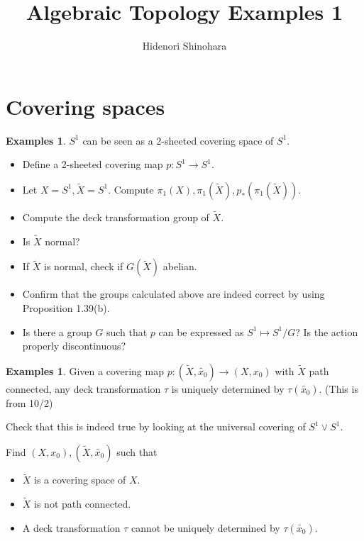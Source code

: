 \documentclass[12pt, psamsfonts]{amsart}
\theoremstyle{definition}
\newtheorem{exmps}[thm]{Examples}
\theoremstyle{remark}
\numberwithin{equation}{section}
\begin{document}
\title{Algebraic Topology Examples 1}
\author{Hidenori Shinohara}
\maketitle

\section{Covering spaces}

\begin{exmps}
  $S^1$ can be seen as a 2-sheeted covering space of $S^1$.
  \begin{itemize}
    \item
      Define a 2-sheeted covering map $p: S^1 \rightarrow S^1$.
    \item
      Let $X = S^1, \tilde{X} = S^1$.
      Compute $\pi_1(X), \pi_1(\tilde{X}), p_*(\pi_1(\tilde{X}))$.
    \item
      Compute the deck transformation group of $\tilde{X}$.
    \item
      Is $\tilde{X}$ normal?
    \item
      If $\tilde{X}$ is normal, check if $G(\tilde{X})$ abelian.
    \item
      Confirm that the groups calculated above are indeed correct by using Proposition 1.39(b). 
    \item
      Is there a group $G$ such that $p$ can be expressed as $S^1 \mapsto S^1 / G$?
      Is the action properly discontinuous?
  \end{itemize}
\end{exmps}

\begin{exmps}
  Given a covering map $p: (\tilde{X}, \tilde{x_0}) \rightarrow (X, x_0)$ with $\tilde{X}$ path connected, any deck transformation $\tau$ is uniquely determined by $\tau(\tilde{x_0})$.
  (This is from 10/2)

  Check that this is indeed true by looking at the universal covering of $S^1 \vee S^1$.

  Find $(X, x_0), (\tilde{X}, \tilde{x_0})$ such that
  \begin{itemize}
    \item
      $\tilde{X}$ is a covering space of $X$.
    \item
      $\tilde{X}$ is not path connected.
    \item
      A deck transformation $\tau$ cannot be uniquely determined by $\tau(\tilde{x_0})$.
  \end{itemize}
\end{exmps}
\end{document}
